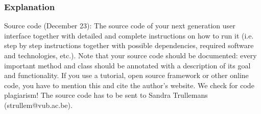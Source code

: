 \documentclass{article}
\begin{document}
\subsubsection{Explanation}











Source code (December 23): The source code of your next generation user interface together with
detailed and complete instructions on how to run it (i.e. step by step instructions together with possible
dependencies, required software and technologies, etc.). Note that your source code should be
documented: every important method and class should be annotated with a description of its goal and
functionality. If you use a tutorial, open source framework or other online code, you have to mention
this and cite the author’s website. We check for code plagiarism! The source code has to be sent to
Sandra Trullemans (strullem@vub.ac.be).
\end{document}
